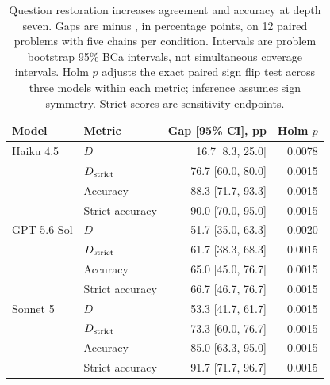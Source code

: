 \begin{table}[t]
\centering
\small
\caption{Question restoration increases agreement and accuracy at depth seven. Gaps are \fixed{} minus \dropq{}, in percentage points, on 12 paired problems with five chains per condition. Intervals are problem bootstrap 95\% BCa intervals, not simultaneous coverage intervals. Holm $p$ adjusts the exact paired sign flip test across three models within each metric; inference assumes sign symmetry. Strict scores are sensitivity endpoints.}
\label{tab:contrasts}
\begin{tabular}{@{}llrr@{}}
\toprule
Model & Metric & Gap [95\% CI], pp & Holm $p$ \\
\midrule
Haiku 4.5 & $D$ & 16.7 [8.3, 25.0] & 0.0078 \\
 & $D_{\rm strict}$ & 76.7 [60.0, 80.0] & 0.0015 \\
 & Accuracy & 88.3 [71.7, 93.3] & 0.0015 \\
 & Strict accuracy & 90.0 [70.0, 95.0] & 0.0015 \\
\addlinespace
GPT 5.6 Sol & $D$ & 51.7 [35.0, 63.3] & 0.0020 \\
 & $D_{\rm strict}$ & 61.7 [38.3, 68.3] & 0.0015 \\
 & Accuracy & 65.0 [45.0, 76.7] & 0.0015 \\
 & Strict accuracy & 66.7 [46.7, 76.7] & 0.0015 \\
\addlinespace
Sonnet 5 & $D$ & 53.3 [41.7, 61.7] & 0.0015 \\
 & $D_{\rm strict}$ & 73.3 [60.0, 76.7] & 0.0015 \\
 & Accuracy & 85.0 [63.3, 95.0] & 0.0015 \\
 & Strict accuracy & 91.7 [71.7, 96.7] & 0.0015 \\
\bottomrule
\end{tabular}
\end{table}
